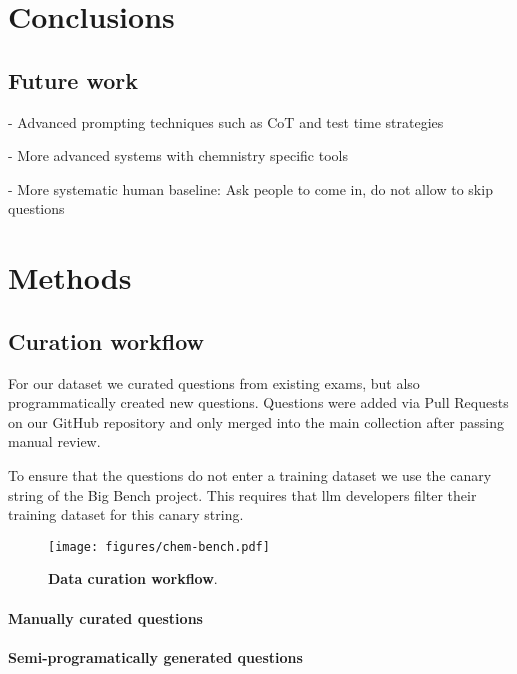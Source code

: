 \documentclass[11pt, oneside]{article}
\begin{document}

\section{Conclusions}

\subsection{Future work}
- Advanced prompting techniques such as CoT and test time strategies 

- More advanced systems with chemnistry specific tools 

- More systematic human baseline: Ask people to come in, do not allow to skip questions

\section{Methods}

\subsection{Curation workflow} \label{sec:curation}
For our dataset we curated questions from existing exams, but also programmatically created new questions. 
Questions were added via Pull Requests on our GitHub repository and only merged into the main collection after passing manual review.

To ensure that the questions do not enter a training dataset we use the canary string of the Big Bench project.
This requires that \Gls{llm} developers filter their training dataset for this canary string.  

\begin{figure}
    \texttt{[image: figures/chem-bench.pdf]}
        \caption{\textbf{Data curation workflow}.}
\end{figure}

\paragraph{Manually curated questions}

\paragraph{Semi-programatically generated questions}
\end{document}
